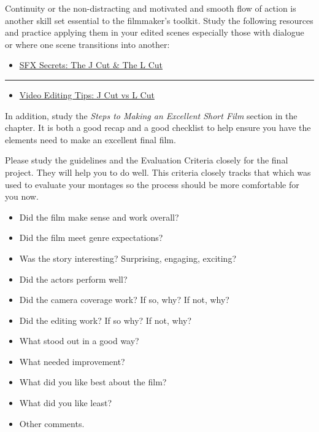 \documentclass[
]{book}
\providecommand{\tightlist}{%
  \setlength{\itemsep}{0pt}\setlength{\parskip}{0pt}}
\begin{document}
\begin{reflect}
Continuity or the non-distracting and motivated and smooth flow of action is another skill set essential to the filmmaker's toolkit. Study the following resources and practice applying them in your edited scenes especially those with dialogue or where one scene transitions into another:

\begin{itemize}
\tightlist
\item
  \href{https://www.youtube-nocookie.com/embed/eyH-a964kAs}{SFX Secrets: The J Cut \& The L Cut}
\end{itemize}

\begin{center}\rule{0.5\linewidth}{0.5pt}\end{center}

\begin{itemize}
\tightlist
\item
  \href{https://www.youtube-nocookie.com/embed/fT5rRPMnka0}{Video Editing Tips: J Cut vs L Cut}
\end{itemize}

In addition, study the \emph{Steps to Making an Excellent Short Film} section in the chapter. It is both a good recap and a good checklist to help ensure you have the elements need to make an excellent final film.

Please study the guidelines and the Evaluation Criteria closely for the final project. They will help you to do well. This criteria closely tracks that which was used to evaluate your montages so the process should be more comfortable for you now.

\begin{itemize}
\tightlist
\item
  Did the film make sense and work overall?\\
\item
  Did the film meet genre expectations?\\
\item
  Was the story interesting? Surprising, engaging, exciting?\\
\item
  Did the actors perform well?\\
\item
  Did the camera coverage work? If so, why? If not, why?\\
\item
  Did the editing work? If so why? If not, why?\\
\item
  What stood out in a good way?\\
\item
  What needed improvement?\\
\item
  What did you like best about the film?\\
\item
  What did you like least?\\
\item
  Other comments.
\end{itemize}
\end{reflect}
\end{document}
